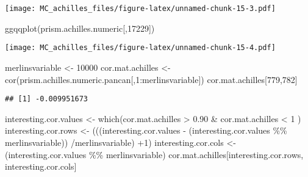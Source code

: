 \documentclass[
]{article}
\newenvironment{Shaded}{\begin{snugshade}}{\end{snugshade}}
\newcommand{\DecValTok}[1]{\textcolor[rgb]{0.00,0.00,0.81}{#1}}
\newcommand{\FloatTok}[1]{\textcolor[rgb]{0.00,0.00,0.81}{#1}}
\newcommand{\FunctionTok}[1]{\textcolor[rgb]{0.00,0.00,0.00}{#1}}
\newcommand{\NormalTok}[1]{#1}
\newcommand{\OtherTok}[1]{\textcolor[rgb]{0.56,0.35,0.01}{#1}}
\newcommand{\SpecialCharTok}[1]{\textcolor[rgb]{0.00,0.00,0.00}{#1}}
\begin{document}
\texttt{[image: MC\_achilles\_files/figure-latex/unnamed-chunk-15-3.pdf]}

\begin{Shaded}
\begin{Highlighting}[]
\FunctionTok{ggqqplot}\NormalTok{(prism.achilles.numeric[,}\DecValTok{17229}\NormalTok{])}
\end{Highlighting}
\end{Shaded}

\texttt{[image: MC\_achilles\_files/figure-latex/unnamed-chunk-15-4.pdf]}

\begin{Shaded}
\begin{Highlighting}[]
\NormalTok{merlinsvariable }\OtherTok{\textless{}{-}} \DecValTok{10000}
\NormalTok{cor.mat.achilles }\OtherTok{\textless{}{-}} \FunctionTok{cor}\NormalTok{(prism.achilles.numeric.pancan[,}\DecValTok{1}\SpecialCharTok{:}\NormalTok{merlinsvariable])}
\NormalTok{cor.mat.achilles[}\DecValTok{779}\NormalTok{,}\DecValTok{782}\NormalTok{]}
\end{Highlighting}
\end{Shaded}

\begin{verbatim}
## [1] -0.009951673
\end{verbatim}

\begin{Shaded}
\begin{Highlighting}[]
\NormalTok{interesting.cor.values }\OtherTok{\textless{}{-}} \FunctionTok{which}\NormalTok{(cor.mat.achilles }\SpecialCharTok{\textgreater{}} \FloatTok{0.90} \SpecialCharTok{\&}\NormalTok{ cor.mat.achilles }\SpecialCharTok{\textless{}} \DecValTok{1}\NormalTok{ ) }
\NormalTok{interesting.cor.rows }\OtherTok{\textless{}{-}}\NormalTok{ (((interesting.cor.values }\SpecialCharTok{{-}}\NormalTok{ (interesting.cor.values }\SpecialCharTok{\%\%}\NormalTok{ merlinsvariable)) }\SpecialCharTok{/}\NormalTok{merlinsvariable) }\SpecialCharTok{+}\DecValTok{1}\NormalTok{)}
\NormalTok{interesting.cor.cols }\OtherTok{\textless{}{-}}\NormalTok{ (interesting.cor.values }\SpecialCharTok{\%\%}\NormalTok{ merlinsvariable)}
\NormalTok{cor.mat.achilles[interesting.cor.rows,  interesting.cor.cols]}
\end{Highlighting}
\end{Shaded}
\end{document}
